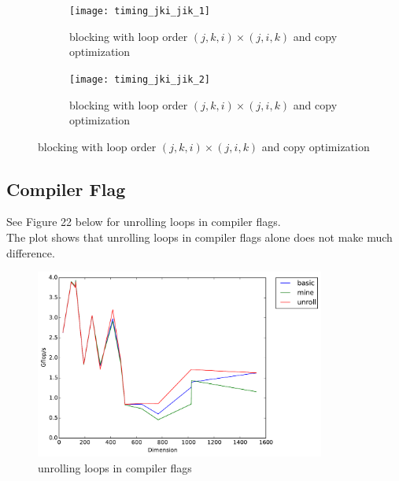 \documentclass[12pt]{article}
\numberwithin{equation}{section}
\begin{document}
\begin{figure}[!ht]
   \begin{subfigure}
      \centering
        \begin{center}
      \texttt{[image: timing\_jki\_jik\_1]}
        \end{center}
      \label{aload0}
      \caption{blocking with loop order $(j, k, i)\times(j, i, k)$ and copy optimization}
  \end{subfigure}
  \begin{subfigure}
      \centering
        \begin{center}
      \texttt{[image: timing\_jki\_jik\_2]}
        \end{center}
      \label{aload1}
      \caption{blocking with loop order $(j, k, i)\times(j, i, k)$ and copy optimization}
  \end{subfigure}

\end{figure}





\subsection{Compiler Flag}

See Figure 22 below for unrolling loops in compiler flags.
\\
The plot shows that unrolling loops in compiler flags alone does not make much difference.

\begin{figure}[!ht]
\begin{center}
\includegraphics[width=0.85\textwidth] {timing_unroll}
\caption{unrolling loops in compiler flags}
\end{center}
\end{figure}
\end{document}

